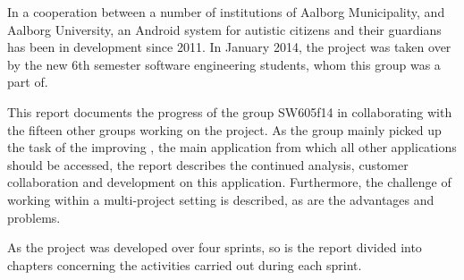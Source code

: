 In a cooperation between a number of institutions of Aalborg Municipality, and Aalborg University, an Android system for autistic citizens and their guardians has been in development since 2011.
In January 2014, the project was taken over by the new 6th semester software engineering students, whom this group was a part of.

This report documents the progress of the group SW605f14 in collaborating with the fifteen other groups working on the project.
As the group mainly picked up the task of the improving \launcher, the main application from which all other applications should be accessed, the report describes the continued analysis, customer collaboration and development on this application.
Furthermore, the challenge of working within a multi-project setting is described, as are the advantages and problems.

As the project was developed over four sprints, so is the report divided into chapters concerning the activities carried out during each sprint.